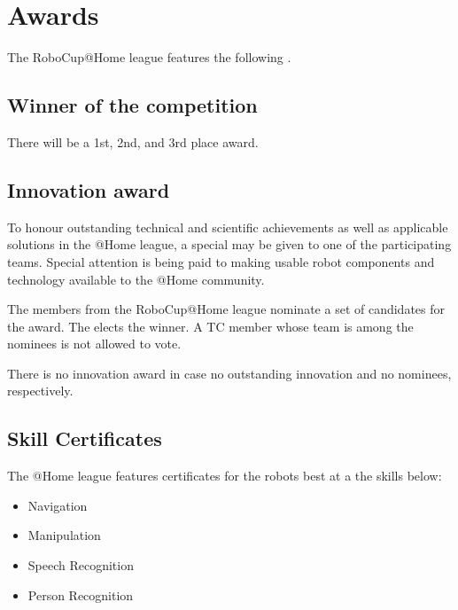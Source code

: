 \section{Awards}
The RoboCup@Home league features the following .

\subsection{Winner of the competition}
There will be a 1st, 2nd, and 3rd place award.

\subsection{Innovation award}
To honour outstanding technical and scientific achievements as well as applicable solutions in the @Home league, a special  may be given to one of the participating teams. Special attention is being paid to making usable robot components and technology available to the @Home community.

The  members from the RoboCup@Home league nominate a set of candidates for the award. The  elects the winner. A TC member whose team is among the nominees is not allowed to vote.

There is no innovation award in case no outstanding innovation and no nominees, respectively.

%

\subsection{Skill Certificates}
  The @Home league features certificates for the robots best at a the skills below:
  \begin{itemize}
   \item Navigation
   \item Manipulation
   \item Speech Recognition
   \item Person Recognition
  \end{itemize}
  
